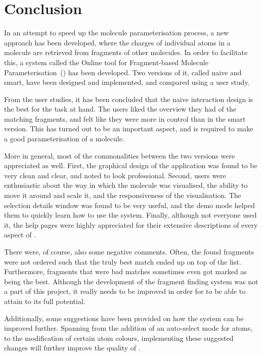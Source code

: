 \chapter{Conclusion}

%

In an attempt to speed up the molecule parameterisation process, a new approach has been developed, where the charges of individual atoms in a molecule are retrieved from fragments of other molecules. In order to facilitate this, a system called the Online tool for Fragment-based Molecule Parameterisation~(\oframp) has been developed. Two versions of it, called naive and smart, have been designed and implemented, and compared using a user study.

From the user studies, it has been concluded that the naive interaction design is the best for the task at hand. The users liked the overview they had of the matching fragments, and felt like they were more in control than in the smart version. This has turned out to be an important aspect, and is required to make a good parameterisation of a molecule.

More in general, most of the commonalities between the two versions were appreciated as well. First, the graphical design of the application was found to be very clean and clear, and noted to look professional. Second, users were enthusiastic about the way in which the molecule was visualised, the ability to move it around and scale it, and the responsiveness of the visualisation. The selection details window was found to be very useful, and the demo mode helped them to quickly learn how to use the system. Finally, although not everyone used it, the help pages were highly appreciated for their extensive descriptions of every aspect of \oframp.

There were, of course, also some negative comments. Often, the found fragments were not ordered such that the truly best match ended up on top of the list. Furthermore, fragments that were bad matches sometimes even got marked as being the best. Although the development of the fragment finding system was not a part of this project, it really needs to be improved in order for \oframp{} to be able to attain to its full potential.

Additionally, some suggestions have been provided on how the system can be improved further. Spanning from the addition of an auto-select mode for atoms, to the modification of certain atom colours, implementing these suggested changes will further improve the quality of \oframp.

